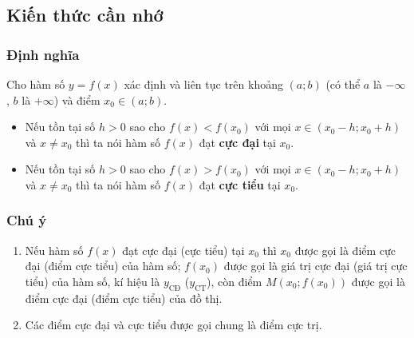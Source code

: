 \subsection{Kiến thức cần nhớ}
\begin{khung}
	\subsubsection{Định nghĩa}
Cho hàm số $y=f(x)$ xác định và liên tục trên khoảng $(a;b)$ (có thể $a$ là $-\infty$, $b$ là $+\infty$) và điểm $x_0\in (a;b)$.
\begin{itemize}
\item Nếu tồn tại số $h>0$ sao cho $f(x)<f(x_0)$ với mọi $x\in (x_0-h;x_0+h)$ và $x\neq x_0$ thì ta nói hàm số $f(x)$ đạt {\bf cực đại} tại $x_0$.
\item Nếu tồn tại số $h>0$ sao cho $f(x)>f(x_0)$ với mọi $x\in (x_0-h;x_0+h)$ và $x\neq x_0$ thì ta nói hàm số $f(x)$ đạt {\bf cực tiểu} tại $x_0$.
\end{itemize}
\begin{center}
\end{center}
\subsubsection{Chú ý}
\begin{enumerate}
\item  Nếu hàm số $f(x)$ đạt cực đại (cực tiểu) tại $x_0$ thì $x_0$ được gọi là điểm cực đại (điểm cực tiểu) của hàm số; $f\left(x_0\right)$ được gọi là giá trị cực đại (giá trị cực tiểu) của hàm số, kí hiệu là $y_\text{CĐ}$ ($y_\text{CT}$), còn điểm $M\left(x_0 ; f\left(x_0\right)\right)$ được gọi là điểm cực đại (điểm cực tiểu) của đồ thị.
\item Các điểm cực đại và cực tiểu được gọi chung là điểm cực trị. 
\end{enumerate}
\end{khung}
